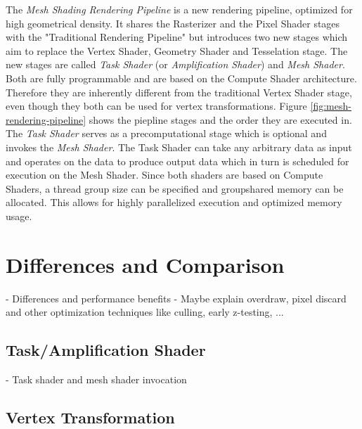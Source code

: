 The \emph{Mesh Shading Rendering Pipeline} is a new rendering pipeline, optimized for high geometrical 
density. It shares the Rasterizer and the Pixel Shader stages with the "Traditional Rendering Pipeline" but 
introduces two new stages which aim to replace the Vertex Shader, Geometry Shader and Tesselation stage.
The new stages are called \emph{Task Shader} (or \emph{Amplification Shader}) and \emph{Mesh Shader}. Both 
are fully programmable and are based on the Compute Shader architecture. Therefore they are inherently different 
from the traditional Vertex Shader stage, even though they both can be used for vertex transformations.
Figure \ref{fig:mesh-rendering-pipeline} shows the piepline stages and the order they are executed in. \\

\noindent
The \emph{Task Shader} serves as a precomputational stage which is optional and invokes the \emph{Mesh Shader}.
The Task Shader can take any arbitrary data as input and operates on the data to produce output data which in 
turn is scheduled for execution on the Mesh Shader. Since both shaders are based on Compute Shaders, a thread 
group size can be specified and groupshared memory can be allocated. This allows for highly parallelized execution 
and optimized memory usage. 






\section{Differences and Comparison} \label{sec-differences-and-comparison}

- Differences and performance benefits
- Maybe explain overdraw, pixel discard and other optimization techniques like culling, early z-testing, ...

\subsection{Task/Amplification Shader} \label{subsec-task-shader}

- Task shader and mesh shader invocation %

\subsection{Vertex Transformation} \label{subsec-vertex-transformation}


